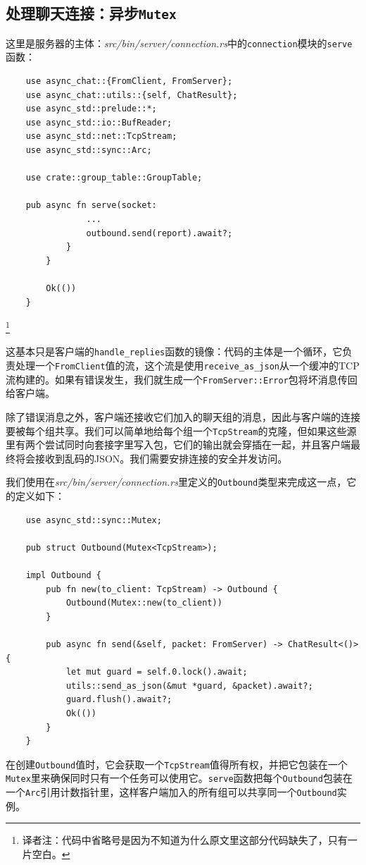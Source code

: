 \subsection{处理聊天连接：异步\texttt{Mutex}}
这里是服务器的主体：\emph{src/bin/server/connection.rs}中的\texttt{connection}模块的\texttt{serve}函数：
\begin{verbatim}
    use async_chat::{FromClient, FromServer};
    use async_chat::utils::{self, ChatResult};
    use async_std::prelude::*;
    use async_std::io::BufReader;
    use async_std::net::TcpStream;
    use async_std::sync::Arc;

    use crate::group_table::GroupTable;

    pub async fn serve(socket: 
                ...
                outbound.send(report).await?;
            }
        }

        Ok(())
    }
\end{verbatim}
\footnote{译者注：代码中省略号是因为不知道为什么原文里这部分代码缺失了，只有一片空白。}

这基本只是客户端的\texttt{handle\_replies}函数的镜像：代码的主体是一个循环，它负责处理一个\texttt{FromClient}值的流，这个流是使用\texttt{receive\_as\_json}从一个缓冲的TCP流构建的。如果有错误发生，我们就生成一个\texttt{FromServer::Error}包将坏消息传回给客户端。

除了错误消息之外，客户端还接收它们加入的聊天组的消息，因此与客户端的连接要被每个组共享。我们可以简单地给每个组一个\texttt{TcpStream}的克隆，但如果这些源里有两个尝试同时向套接字里写入包，它们的输出就会穿插在一起，并且客户端最终将会接收到乱码的JSON。我们需要安排连接的安全并发访问。

我们使用在\emph{src/bin/server/connection.rs}里定义的\texttt{Outbound}类型来完成这一点，它的定义如下：
\begin{verbatim}
    use async_std::sync::Mutex;

    pub struct Outbound(Mutex<TcpStream>);

    impl Outbound {
        pub fn new(to_client: TcpStream) -> Outbound {
            Outbound(Mutex::new(to_client))
        }

        pub async fn send(&self, packet: FromServer) -> ChatResult<()> {
            let mut guard = self.0.lock().await;
            utils::send_as_json(&mut *guard, &packet).await?;
            guard.flush().await?;
            Ok(())
        }
    }
\end{verbatim}

在创建\texttt{Outbound}值时，它会获取一个\texttt{TcpStream}值得所有权，并把它包装在一个\texttt{Mutex}里来确保同时只有一个任务可以使用它。\texttt{serve}函数把每个\texttt{Outbound}包装在一个\texttt{Arc}引用计数指针里，这样客户端加入的所有组可以共享同一个\texttt{Outbound}实例。

